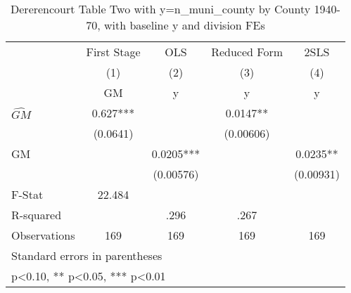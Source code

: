 \begin{table}[htbp]\centering
\def\sym#1{\ifmmode^{#1}\else\(^{#1}\)\fi}
\caption{Dererencourt Table Two with y=n\_muni\_county by County 1940-70, with baseline y and division FEs}
\begin{tabular}{l*{4}{c}}
\toprule
                    & First Stage   &         OLS   &Reduced Form   &        2SLS   \\
                    &\multicolumn{1}{c}{(1)}&\multicolumn{1}{c}{(2)}&\multicolumn{1}{c}{(3)}&\multicolumn{1}{c}{(4)}\\
                    &\multicolumn{1}{c}{GM}&\multicolumn{1}{c}{y}&\multicolumn{1}{c}{y}&\multicolumn{1}{c}{y}\\
\midrule
$\hat{GM}$          &       0.627***&               &      0.0147** &               \\
                    &    (0.0641)   &               &   (0.00606)   &               \\
\addlinespace
GM                  &               &      0.0205***&               &      0.0235** \\
                    &               &   (0.00576)   &               &   (0.00931)   \\
\midrule
F-Stat              &      22.484   &               &               &               \\
R-squared           &               &        .296   &        .267   &               \\
Observations        &         169   &         169   &         169   &         169   \\
\bottomrule
\multicolumn{5}{l}{\footnotesize Standard errors in parentheses}\\
\multicolumn{5}{l}{\footnotesize * p<0.10, ** p<0.05, *** p<0.01}\\
\end{tabular}
\end{table}
